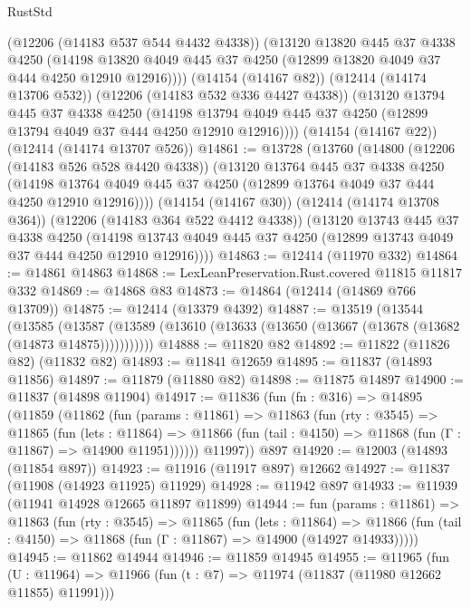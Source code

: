 \begin{lexlean}{RustStd}
\begin{coremodule}
{\begin{coremodule}
{{{{{{{{{{{{{{{{{{{{{{{{{{{{{{{{{{{{{{{{{{{{{{{{{{        (@12206 (@14183 @537 @544 @4432 @4338))
        (@13120
          @13820
          @445
          @37
          @4338
          @4250
          (@14198 @13820 @4049 @445 @37 @4250 (@12899 @13820 @4049 @37 @444 @4250 @12910 @12916))))
      (@14154 (@14167 @82))
      (@12414 (@14174 @13706 @532))
      (@12206 (@14183 @532 @336 @4427 @4338))
      (@13120
        @13794
        @445
        @37
        @4338
        @4250
        (@14198 @13794 @4049 @445 @37 @4250 (@12899 @13794 @4049 @37 @444 @4250 @12910 @12916))))
    (@14154 (@14167 @22))
    (@12414 (@14174 @13707 @526))
@14861 := @13728
    (@13760
      (@14800
        (@12206 (@14183 @526 @528 @4420 @4338))
        (@13120
          @13764
          @445
          @37
          @4338
          @4250
          (@14198 @13764 @4049 @445 @37 @4250 (@12899 @13764 @4049 @37 @444 @4250 @12910 @12916))))
      (@14154 (@14167 @30))
      (@12414 (@14174 @13708 @364))
      (@12206 (@14183 @364 @522 @4412 @4338))
      (@13120
        @13743
        @445
        @37
        @4338
        @4250
        (@14198 @13743 @4049 @445 @37 @4250 (@12899 @13743 @4049 @37 @444 @4250 @12910 @12916))))
@14863 := @12414 (@11970 @332)
@14864 := @14861 @14863
@14868 := LexLeanPreservation.Rust.covered @11815 @11817 @332
@14869 := @14868 @83
@14873 := @14864 (@12414 (@14869 @766 @13709))
@14875 := @12414 (@13379 @4392)
@14887 := @13519
    (@13544
      (@13585
        (@13587 (@13589 (@13610 (@13633 (@13650 (@13667 (@13678 (@13682 (@14873 @14875)))))))))))
@14888 := @11820 @82
@14892 := @11822 (@11826 @82) (@11832 @82)
@14893 := @11841 @12659
@14895 := @11837 (@14893 @11856)
@14897 := @11879 (@11880 @82)
@14898 := @11875 @14897
@14900 := @11837 (@14898 @11904)
@14917 := @11836
    (fun (fn : @316) =>
    @14895
      (@11859
        (@11862
          (fun (params : @11861) =>
          @11863
            (fun (rty : @3545) =>
            @11865
              (fun (lets : @11864) =>
              @11866 (fun (tail : @4150) => @11868 (fun (Γ : @11867) => @14900 @11951))))))
        @11997))
    @897
@14920 := @12003 (@14893 (@11854 @897))
@14923 := @11916 (@11917 @897) @12662
@14927 := @11837 (@11908 (@14923 @11925) @11929)
@14928 := @11942 @897
@14933 := @11939 (@11941 @14928 @12665 @11897 @11899)
@14944 := fun (params : @11861) =>
  @11863
    (fun (rty : @3545) =>
    @11865
      (fun (lets : @11864) =>
      @11866 (fun (tail : @4150) => @11868 (fun (Γ : @11867) => @14900 (@14927 @14933)))))
@14945 := @11862 @14944
@14946 := @11859 @14945
@14955 := @11965
    (fun (U : @11964) => @11966 (fun (t : @7) => @11974 (@11837 (@11980 @12662 @11855) @11991)))
}}}}}}}}}}}}}}}}}}}}}}}}}}}}}}}}}}}}}}}}}}}}}}}}}}
\end{coremodule}}
\end{coremodule}
\end{lexlean}
